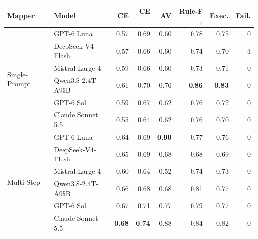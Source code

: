 \begin{tabular}{llrrrrrr}
\toprule
\textbf{Mapper} & \textbf{Model} & CE & CE$_{\equiv}$ & AV & Rule-F$_1$ & Exec. & Fail. \\
\midrule
\multirow{6}{*}{Single-Prompt} & GPT-6 Luna & 0.57 & 0.69 & 0.60 & 0.78 & 0.75 & 0 \\
 & DeepSeek-V4-Flash & 0.57 & 0.66 & 0.60 & 0.74 & 0.70 & 3 \\
 & Mistral Large 4 & 0.59 & 0.66 & 0.60 & 0.73 & 0.71 & 0 \\
 & Qwen3.8-2.4T-A95B & 0.61 & 0.70 & 0.76 & \textbf{0.86} & \textbf{0.83} & 0 \\
 & GPT-6 Sol & 0.59 & 0.67 & 0.62 & 0.76 & 0.72 & 0 \\
 & Claude Sonnet 5.5 & 0.55 & 0.64 & 0.62 & 0.76 & 0.70 & 0 \\
\midrule
\multirow{6}{*}{Multi-Step} & GPT-6 Luna & 0.64 & 0.69 & \textbf{0.90} & 0.77 & 0.76 & 0 \\
 & DeepSeek-V4-Flash & 0.65 & 0.69 & 0.68 & 0.68 & 0.69 & 0 \\
 & Mistral Large 4 & 0.60 & 0.64 & 0.52 & 0.74 & 0.73 & 0 \\
 & Qwen3.8-2.4T-A95B & 0.66 & 0.68 & 0.68 & 0.81 & 0.77 & 0 \\
 & GPT-6 Sol & 0.67 & 0.71 & 0.77 & 0.79 & 0.77 & 0 \\
 & Claude Sonnet 5.5 & \textbf{0.68} & \textbf{0.74} & 0.88 & 0.84 & 0.82 & 0 \\
\bottomrule
\end{tabular}
